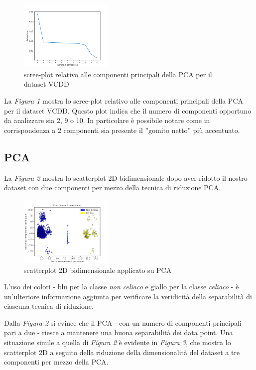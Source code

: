\documentclass[11pt,a4paper,twocolumn]{article}
\begin{document}
\begin{figure}[h]
	\centering
	\includegraphics[width=0.4\textwidth]{img/scree_plot.png}
	\caption{scree-plot relativo alle componenti principali della PCA per il dataset VCDD}
\end{figure}

	La \emph{Figura 1} mostra lo scree-plot relativo alle componenti principali della PCA per il dataset VCDD. Questo plot indica che il numero di componenti opportuno da analizzare sia 2, 9 o 10. In particolare è possibile notare come in corrispondenza a 2 componenti sia presente il ”gomito netto” più accentuato.

\subsection{PCA}
	La \emph{Figura 2} mostra lo scatterplot 2D bidimensionale dopo aver ridotto il nostro dataset con due componenti per mezzo della tecnica di riduzione PCA.

\begin{figure}[h]
		\centering
		\includegraphics[width=0.4\textwidth]{img/PCA_2Dnc2.png}
		\caption{scatterplot 2D bidimensionale applicato su PCA}
\end{figure} 
	 L'uso dei colori - blu per la classe \emph{non celiaco} e giallo per la classe \emph{celiaco} - è un'ulteriore informazione aggiunta per verificare la veridicità della separabilità di ciascuna tecnica di riduzione. \par
	 Dalla \emph{Figura 2} si evince che il PCA - con un numero di componenti principali pari a due - riesce a mantenere una buona separabilità dei data point. \newpage
 Una situazione simile a quella di \emph{Figura 2} è evidente in \emph{Figura 3}, che mostra lo scatterplot 2D a seguito della riduzione della dimensionalità del dataset a tre componenti per mezzo della PCA.
\end{document}
